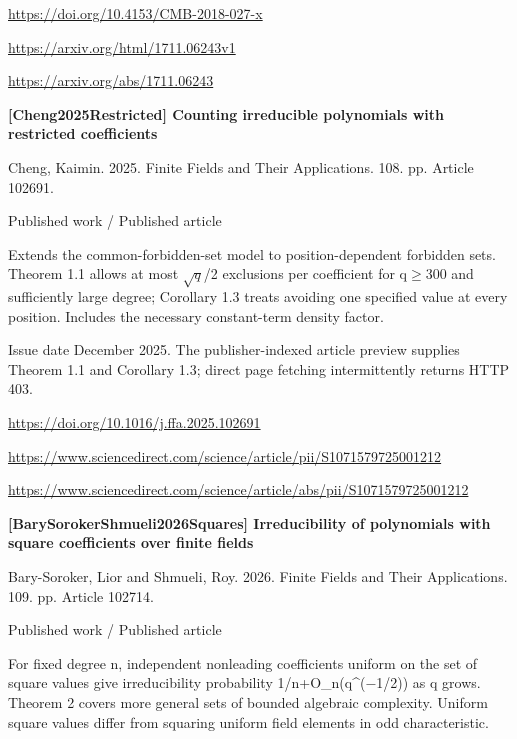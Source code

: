 \documentclass[11pt,a4paper,oneside,openany]{book}
\begin{document}
{\footnotesize\url{https://doi.org/10.4153/CMB-2018-027-x}}\par
{\footnotesize\url{https://arxiv.org/html/1711.06243v1}}\par
{\footnotesize\url{https://arxiv.org/abs/1711.06243}}\par
\vspace{9pt}
\hypertarget{ref:Cheng2025Restricted}{}
{\sffamily\bfseries\color{atlasgreen}[Cheng2025Restricted] Counting irreducible polynomials with restricted coefficients}\par
\color{black} Cheng, Kaimin. 2025. Finite Fields and Their Applications. 108. pp. Article 102691.\par
{\small\sffamily\color{atlasgold}Published work / Published article}\par
\color{black} Extends the common-forbidden-set model to position-dependent forbidden sets. Theorem 1.1 allows at most \(\sqrt{q}\)/2 exclusions per coefficient for q\ensuremath{\ge}300 and sufficiently large degree; Corollary 1.3 treats avoiding one specified value at every position. Includes the necessary constant-term density factor.\par
{\small Issue date December 2025. The publisher-indexed article preview supplies Theorem 1.1 and Corollary 1.3; direct page fetching intermittently returns HTTP 403.}\par
{\footnotesize\url{https://doi.org/10.1016/j.ffa.2025.102691}}\par
{\footnotesize\url{https://www.sciencedirect.com/science/article/pii/S1071579725001212}}\par
{\footnotesize\url{https://www.sciencedirect.com/science/article/abs/pii/S1071579725001212}}\par
\vspace{9pt}
\hypertarget{ref:BarySorokerShmueli2026Squares}{}
{\sffamily\bfseries\color{atlasgreen}[BarySorokerShmueli2026Squares] Irreducibility of polynomials with square coefficients over finite fields}\par
\color{black} Bary-Soroker, Lior and Shmueli, Roy. 2026. Finite Fields and Their Applications. 109. pp. Article 102714.\par
{\small\sffamily\color{atlasgold}Published work / Published article}\par
\color{black} For fixed degree n, independent nonleading coefficients uniform on the set of square values give irreducibility probability 1/n+O\_\allowbreak{}n(q\textasciicircum{}(\ensuremath{-}1/2)) as q grows. Theorem 2 covers more general sets of bounded algebraic complexity. Uniform square values differ from squaring uniform field elements in odd characteristic.\par
\end{document}
